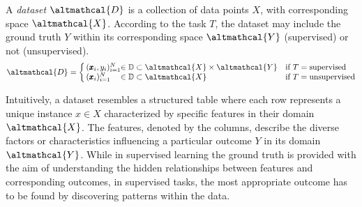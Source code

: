 \documentclass[a4paper,12pt,times,numbered,print,index]{Classes/PhDThesisPSnPDF}
\begin{document}
\begin{definition}[Dataset]\label{def:dataset}
    A \textit{dataset} $\altmathcal{D}$ is a collection of data points $X$, with corresponding space $\altmathcal{X}$.
    According to the task $T$, the dataset may include the ground truth $Y$ within its corresponding space $\altmathcal{Y}$ (supervised) or not (unsupervised).
    \begin{equation*}\label{eq:dataset}
        \altmathcal{D} = \left\lbrace\,
        \begin{array}{@{}l@{}l@{\quad}l@{}}
            (\pmb{x}_i, y_i)_{i=1}^N & \in \mathbb{D} \subset \altmathcal{X} \times \altmathcal{Y} & \text{{if }} T = \text{{supervised}} \\
            (\pmb{x}_i)_{i=1}^N & \in \mathbb{D} \subset \altmathcal{X} & \text{{if }} T = \text{{unsupervised}}
        \end{array}
        \right.
    \end{equation*}
\end{definition}

Intuitively, a dataset resembles a structured table where each row represents a unique instance $x \in X$ characterized by specific features in their domain $\altmathcal{X}$.
The features, denoted by the columns, describe the diverse factors or characteristics influencing a particular outcome $Y$ in its domain $\altmathcal{Y}$.
While in supervised learning the ground truth is provided with the aim of understanding the hidden relationships between features and corresponding outcomes, in supervised tasks, the most appropriate outcome has to be found by discovering patterns within the data.
\end{document}
